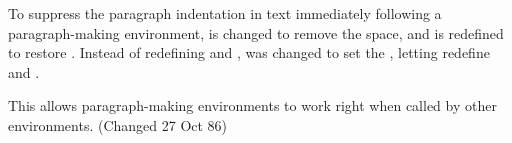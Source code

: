  
 \begin{macro}{\@endparenv}
 \begin{macro}{\@doendpe}
 To suppress the paragraph indentation in text immediately following
 a paragraph-making environment,  is changed to remove the
 space, and  is redefined to restore .  Instead of
 redefining  and ,  was changed to 
 set the , letting  redefine  and 
 .  

 This allows paragraph-making environments to work right when called 
 by other environments. (Changed 27 Oct 86)
    \begin{teX}
\def\@endparenv{%
  \addpenalty\@endparpenalty\addvspace\@topsepadd\@endpetrue}
    \end{teX}

    \begin{teX}
\def\@doendpe{\@endpetrue
     \def\par{\@restorepar\everypar{}
          \par\@endpefalse}\everypar
    \end{teX}
    
    Use |\setbox0=\lastbox| instead of   |\hskip -\parindent|   
    so that a \cs{noindent} becomes a no-op when used before 
    a line immediately following a list environment(23 Oct 86).
 \changes{v1.0k}{1995/11/07}{Enclosed \cs{setbox0} assignment by a
 group so that it leaves the contents of box $0$ intact.
    } 
    \begin{teX}
               {{\setbox\z@\lastbox}\everypar{}\@endpefalse}}
    \end{teX}
 \end{macro}
 \end{macro}

 
 \begin{macro}{\if@endpe}
 \begin{macro}{\@endpefalse}
 \begin{macro}{\@endpeltrue}
    \begin{teX}
\newif\if@endpe
\@endpefalse
    \end{teX}
 \end{macro}\end{macro}\end{macro}

 
 \begin{macro}{\@mklab}
    \begin{teX}
\def\@mklab#1{\hfil #1}
    \end{teX}
 \end{macro}

